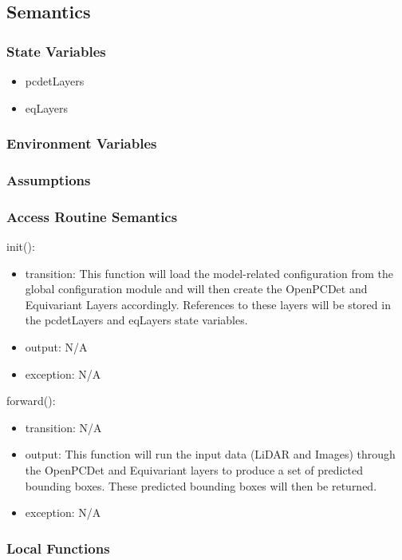 \documentclass[12pt, titlepage]{article}
\begin{document}
\subsection{Semantics}

\subsubsection{State Variables}
\begin{itemize}
  \item pcdetLayers
  \item eqLayers
\end{itemize}

\subsubsection{Environment Variables}


\subsubsection{Assumptions}

\subsubsection{Access Routine Semantics}
\noindent init():
\begin{itemize}
\item transition: This function will load the model-related configuration from the global configuration module and will then create the OpenPCDet and Equivariant Layers accordingly. References to these layers will be stored in the pcdetLayers and eqLayers state variables. 
\item output: N/A
\item exception: N/A
\end{itemize}

\noindent forward():
\begin{itemize}
\item transition: N/A 
\item output: This function will run the input data (LiDAR and Images) through the OpenPCDet and Equivariant layers to produce a set of predicted bounding boxes. These predicted bounding boxes will then be returned. 
\item exception: N/A
\end{itemize}

\subsubsection{Local Functions}
\end{document}
